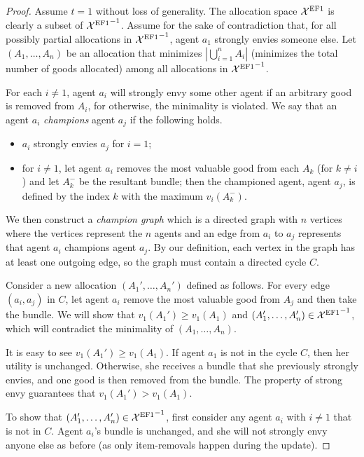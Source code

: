 \begin{proof}
    Assume $t=1$ without loss of generality.
    The allocation space $\mathcal{X}^{\mathrm{EF1}}$ is clearly a subset of ${\mathcal{X}^{\mathrm{EF1}}}^{-1}$.
    Assume for the sake of contradiction that, for all possibly partial allocations in ${\mathcal{X}^{\mathrm{EF1}}}^{-1}$, agent $a_1$ strongly envies someone else.
    Let $(A_1,\ldots,A_n)$ be  an allocation that minimizes $|\bigcup_{i=1}^nA_i|$ (minimizes the total number of goods allocated) among all allocations in ${\mathcal{X}^{\mathrm{EF1}}}^{-1}$.

    For each $i\neq 1$, agent $a_i$ will strongly envy some other agent if an arbitrary good is removed from $A_i$, for otherwise, the minimality is violated.
    We say that an agent $a_i$ \emph{champions} agent $a_j$ if the following holds.
    \begin{itemize}
        \item $a_i$ strongly envies $a_j$ for $i=1$;
        \item for $i\neq 1$, let agent $a_i$ removes the most valuable good from each $A_k$ (for $k\neq i$) and let $A_k^-$ be the resultant bundle; then the championed agent, agent $a_j$, is defined by the index $k$ with the maximum $v_i(A_k^-)$.
    \end{itemize}
    We then construct a \emph{champion graph} which is a directed graph with $n$ vertices where the vertices represent the $n$ agents and an edge from $a_i$ to $a_j$ represents that agent $a_i$ champions agent $a_j$.
    By our definition, each vertex in the graph has at least one outgoing edge, so the graph must contain a directed cycle $C$.

    Consider a new allocation $(A_1',\ldots,A_n')$ defined as follows. For every edge $(a_i,a_j)$ in $C$, let agent $a_i$ remove the most valuable good from $A_{j}$ and then take the bundle.
    We will show that $v_1(A_1')\geq v_1(A_1)$ and $(A_1',\ldots,A_n')\in {\mathcal{X}^{\mathrm{EF1}}}^{-1}$, which will contradict the minimality of $(A_1,\ldots,A_n)$.

    It is easy to see $v_1(A_1')\geq v_1(A_1)$. If agent $a_1$ is not in the cycle $C$, then her utility is unchanged. Otherwise, she receives a bundle that she previously strongly envies, and one good is then removed from the bundle. The property of strong envy guarantees that $v_1(A_1')>v_1(A_1)$.

    To show that $(A_1',\ldots,A_n')\in {\mathcal{X}^{\mathrm{EF1}}}^{-1}$, first consider any agent $a_i$ with $i\neq 1$ that is not in $C$.
    Agent $a_i$'s bundle is unchanged, and she will not strongly envy anyone else as before (as only item-removals happen during the update).
    

\end{proof}
